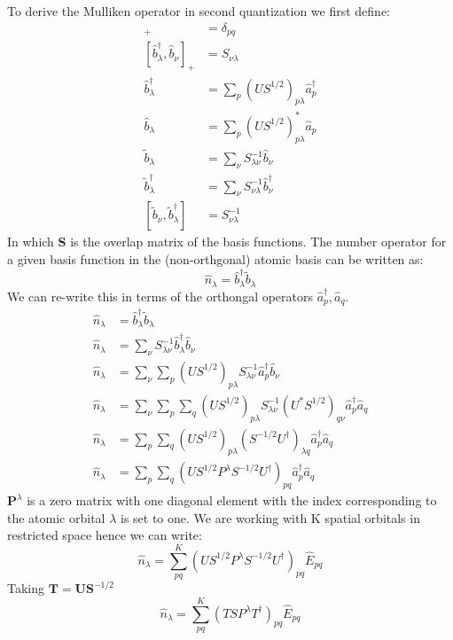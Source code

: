   To derive the Mulliken operator in second quantization we first define:
  \begin{align}
    [ \hat{a}_p^\dagger, \hat{a}_q ]_+ &= \delta_{pq} \\
      [ \hat{b}_\lambda^\dagger, \hat{b}_\nu ]_+ &= S_{\nu \lambda} \\
  \hat{b}_{\lambda}^\dagger &= \sum_p (U S^{1/2})_{p \lambda} \hat{a}_p^\dagger \\
    \hat{b}_\lambda &= \sum_p ( U S^{1/2})^*_{p \lambda} \hat{a}_p \\
  \widetilde{b}_\lambda &= \sum_\nu S_{\lambda \nu}^{-1} \hat{b}_\nu \\
    \widetilde{b}^\dagger_\lambda &= \sum_\nu S_{\nu \lambda}^{-1} \hat{b}^\dagger_\nu \\
  [\widetilde{b}_\nu,\widetilde{b}^\dagger_\lambda ] &= S^{-1}_{\nu \lambda}
  \end{align}
  In which \textbf{S} is the overlap matrix of the basis functions.
  The number operator for a given basis function in the (non-orthgonal) atomic basis can be written as\cite{surjan2012second}:
  \begin{equation}
   \hat{n}_\lambda = \hat{b}_{\lambda}^\dagger \widetilde{b}_\lambda
  \end{equation}
  We can re-write this in terms of the orthongal operators $\hat{a}_p^\dagger, \hat{a}_q$.
  \begin{align}
  \hat{n}_\lambda &= \hat{b}_{\lambda}^\dagger \widetilde{b}_\lambda \\
  \hat{n}_\lambda &= \sum_\nu S_{\lambda \nu}^{-1} \hat{b}_\lambda^\dagger \hat{b}_\nu \\
  \hat{n}_\lambda &= \sum_\nu \sum_p (U S^{1/2})_{p \lambda} S_{\lambda \nu}^{-1} \hat{a}_p^\dagger \hat{b}_\nu \\
  \hat{n}_\lambda &= \sum_\nu \sum_p \sum_q  (U S^{1/2})_{p \lambda} S_{\lambda \nu}^{-1} ( U^* S^{1/2})_{q \nu}  \hat{a}_p^\dagger \hat{a}_q \\
  \hat{n}_\lambda &= \sum_p \sum_q  (U S^{1/2})_{p \lambda} (S^{-1/2} U^\dagger)_{\lambda q} \hat{a}_p^\dagger \hat{a}_q \\
  \hat{n}_\lambda &= \sum_p \sum_q  (U S^{1/2} P^\lambda S^{-1/2} U^\dagger)_{pq} \hat{a}_p^\dagger \hat{a}_q
  \end{align}
  $\textbf{P}^\lambda$ is a zero matrix with one diagonal element with the index corresponding to the atomic orbital $\lambda$ is set to one.
  We are working with K spatial orbitals in restricted space hence we can write:
  \begin{equation}
     \hat{n}_\lambda = \sum^K_{pq} (U S^{1/2} P^\lambda S^{-1/2} U^\dagger)_{pq} \hat{E}_{pq}
  \end{equation}
  Taking $\textbf{T}= \textbf{U} \textbf{S}^{-1/2}$
  \begin{equation}
     \hat{n}_\lambda =\sum^K_{pq} (T S P^\lambda T^\dagger)_{pq} \hat{E}_{pq}
  \end{equation}


